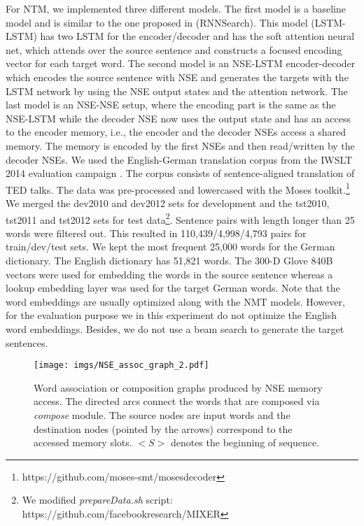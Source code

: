 \documentclass{article}
\begin{document}
For NTM, we implemented three different models. The first model is a baseline model and is similar to the one proposed in \cite{bahdanau:15} (RNNSearch). This model (LSTM-LSTM) has two LSTM for the encoder/decoder and has the soft attention neural net, which attends over the source sentence and constructs a focused encoding vector for each target word. The second model is an NSE-LSTM encoder-decoder which encodes the source sentence with NSE and generates the targets with the LSTM network by using the NSE output states and the attention network. The last model is an NSE-NSE setup, where the encoding part is the same as the NSE-LSTM while the decoder NSE now uses the output state and has an access to the encoder memory, i.e., the encoder and the decoder NSEs access a shared memory. The memory is encoded by the first NSEs and then read/written by the decoder NSEs. 
We used the English-German translation corpus from the IWSLT 2014 evaluation campaign \cite{cettoloEtAl:EAMT2012}. The corpus consists of sentence-aligned translation of TED talks. The data was pre-processed and lowercased with the Moses toolkit.\footnote{https://github.com/moses-smt/mosesdecoder} We merged the dev2010 and dev2012 sets for development and the tst2010, tst2011 and tst2012 sets for test data\footnote{We modified \textit{prepareData.sh} script: https://github.com/facebookresearch/MIXER}. Sentence pairs with length longer than 25 words were filtered out. This resulted in 110,439/4,998/4,793 pairs for train/dev/test sets. We kept the most frequent 25,000 words for the German dictionary. The English dictionary has 51,821 words. The 300-D Glove 840B vectors were used for embedding the words in the source sentence whereas a lookup embedding layer was used for the target German words. Note that the word embeddings are usually optimized along with the NMT models. However, for the evaluation purpose we in this experiment do not optimize the English word embeddings. Besides, we do not use a beam search to generate the target sentences.

\begin{figure*}[tp]
    \centering \texttt{[image: imgs/NSE\_assoc\_graph\_2.pdf]}
       \vspace*{-1.0cm}  
        \caption{\label{fig:asoc}
        Word association or composition graphs produced by NSE memory access. The directed arcs connect the words that are composed via \textit{compose} module. The source nodes are input words and the destination nodes (pointed by the arrows) correspond to the accessed memory slots.  $<S>$ denotes the beginning of sequence.}
\end{figure*}
\end{document}

